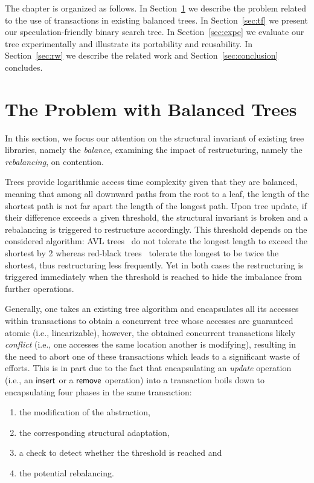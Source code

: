 The chapter is organized as follows. In Section~\ref{sec:pb} we describe the problem related
to the use of transactions in existing balanced trees. In Section~\ref{sec:tf} we present our 
speculation-friendly binary search tree. In Section~\ref{sec:expe} we evaluate our tree
experimentally and illustrate its portability and reusability.
In Section~\ref{sec:rw} we describe the related work and 
Section~\ref{sec:conclusion} concludes.

\section{The Problem with Balanced Trees}\label{sec:pb}

In this section, we focus our attention 
on the structural invariant of existing tree libraries, namely 
the \emph{balance}, examining the impact of restructuring, namely the \emph{rebalancing}, on contention.

Trees provide logarithmic access time complexity given that they are balanced, 
meaning that among all downward paths from the root to a leaf, the length of the shortest path 
is not far apart the length of the longest path. Upon tree update, if their difference exceeds a given threshold, the structural invariant is broken and a rebalancing is triggered to restructure accordingly. 
%
This threshold depends on the considered algorithm: AVL trees~\cite{AVL62} do not tolerate 
the longest length to exceed the shortest by 2 whereas red-black trees~\cite{Bay72} tolerate 
the longest to be twice the shortest, thus restructuring less frequently.  Yet in both cases
the restructuring is triggered immediately when the threshold is reached to hide the imbalance from further operations.

Generally, one takes an existing tree algorithm and encapsulates all its accesses within transactions 
to obtain a concurrent 
tree whose accesses are guaranteed atomic (i.e., linearizable), however, 
the obtained concurrent transactions likely \emph{conflict} (i.e., one accesses the same 
location another is modifying), resulting in the need to abort one of these transactions which leads to  a significant waste of efforts.
This is in part due to the fact that encapsulating an \emph{update} operation (i.e., an $\act{insert}$ or a $\act{remove}$ operation)
into a transaction boils down to encapsulating four phases in the same transaction:
\begin{enumerate}
	\item the modification of the abstraction, 
	\item the corresponding structural adaptation,
	\item a check to detect whether the threshold is reached and 
	\item the potential rebalancing.
\end{enumerate}

